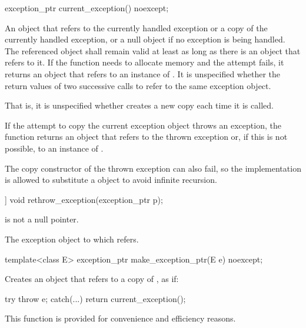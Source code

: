 %
\begin{itemdecl}
exception_ptr current_exception() noexcept;
\end{itemdecl}

\begin{itemdescr}
\pnum
\returns
An  object that refers to
the currently handled exception or a copy of the currently
handled exception, or a null  object if no exception is being
handled. The referenced object shall remain valid at least as long as there is an
 object that refers to it.
If the function needs to allocate memory and the attempt fails, it returns an
 object that refers to an instance of .
It is unspecified whether the return values of two successive calls to
 refer to the same exception object.
\begin{note}
That is, it is unspecified whether 
creates a new copy each time it is called.
\end{note}
If the attempt to copy the current exception object throws an exception, the function
returns an  object that refers to the thrown exception or,
if this is not possible, to an instance of .
\begin{note}
The
copy constructor of the thrown exception can also fail, so the implementation is allowed
to substitute a  object to avoid infinite
recursion.
\end{note}
\end{itemdescr}

%
\begin{itemdecl}
[[noreturn]] void rethrow_exception(exception_ptr p);
\end{itemdecl}

\begin{itemdescr}
\pnum
\expects
{} is not a null pointer.

\pnum
\throws
The exception object to which  refers.
\end{itemdescr}

%
\begin{itemdecl}
template<class E> exception_ptr make_exception_ptr(E e) noexcept;
\end{itemdecl}

\begin{itemdescr}
\pnum
\effects
Creates an  object that refers to a copy of , as if:
\begin{codeblock}
try {
  throw e;
} catch(...) {
  return current_exception();
}
\end{codeblock}

\pnum
\begin{note}
This function is provided for convenience and
efficiency reasons.
\end{note}
\end{itemdescr}

